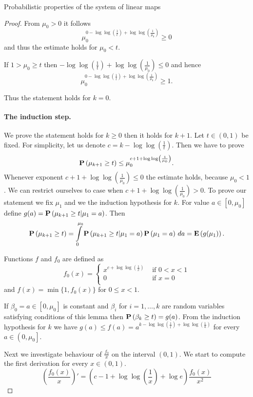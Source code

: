 \begin{section}{Probabilistic properties of the system of linear maps}
\begin{proof}
From $\mu_0 > 0$ it follows
\[
	\mu_0^{0 - \log \log \left(\frac{1}{t}\right) + \log \log \left(\frac{1}{\mu_0}\right)} \geq 0
\]
and thus the estimate holds for $\mu_0 < t$.

If $1 > \mu_0 \geq t$ then $-\log \log \left(\frac{1}{t}\right) + \log \log \left(\frac{1}{\mu_0}\right) \leq 0$ and hence
\[
	\mu_0^{0 - \log \log \left(\frac{1}{t}\right) + \log \log \left(\frac{1}{\mu_0}\right)} \geq 1 \text{.}
\]

Thus the statement holds for $k = 0$.

\paragraph*{The induction step.} We prove the statement holds for $k \geq 0$ then it holds for $k + 1$. Let $t \in (0, 1)$ be fixed. For simplicity, let us denote $c = k - \log \log \left(\frac{1}{t}\right)$. Then we have to prove
\[
	\mathbf{P}\left(\mu_{k + 1} \geq t\right) \leq \mu_0 ^ {c + 1 + \log \log \left(\frac{1}{\mu_0}\right)} \text{.}
\]
Whenever exponent $c + 1 + \log \log \left(\frac{1}{\mu_0}\right) \leq 0$ the estimate holds, because $\mu_0 < 1$. We can restrict ourselves to case when $c + 1 + \log \log \left(\frac{1}{\mu_0}\right) > 0$. To prove our statement we fix $\mu_1$ and we the induction hypothesis for $k$. For value $a \in \left[0, \mu_0\right]$ define $g(a) = \mathbf{P}\left(\mu_{k + 1} \geq t | \mu_1 = a\right)$. Then
\[
	\mathbf{P}\left(\mu_{k + 1} \geq t\right) = \int\limits_{0}^{\mu_0}\mathbf{P}\left(\mu_{k + 1} \geq t | \mu_1 = a\right)\mathbf{P}\left(\mu_1 = a\right) \, da = \mathbf{E}\left(g(\mu_1)\right) \text{.}
\]

Functions $f$ and $f_0$ are defined as
\[ 
	f_0(x) = \begin{cases}
		x ^ {c + \log \log \left(\frac{1}{x}\right)} & \text{ if } 0 < x < 1 \\ 
		0 & \text{ if } x = 0 \\
	\end{cases}
\]
and $f(x) = \min \{1, f_0(x) \}$ for $0 \leq x < 1$.

If $\beta_0 = a \in \left[0, \mu_0 \right]$ is constant and $\beta_i$ for $i = 1, \dots, k$ are random variables satisfying conditions of this lemma then $\mathbf{P}\left(\beta_k \geq t\right) = g(a)$. From the induction hypothesis for $k$ we have $g(a) \leq f(a) = a^{k - \log \log \left(\frac{1}{t}\right) + \log \log \left(\frac{1}{a}\right)}$ for every $a \in \left(0, \mu_0 \right]$.

Next we investigate behaviour of $\frac{f_0}{x}$ on the interval $(0, 1)$. We start to compute the first derivation for every $x \in (0, 1)$.
\[
\left(\frac{f_0(x)}{x}\right)' = (c - 1 + \log \log \left( \frac{1}{x} \right) + \log e)\frac{f_0(x)}{x^2}
\]


\end{proof}
\end{section}

